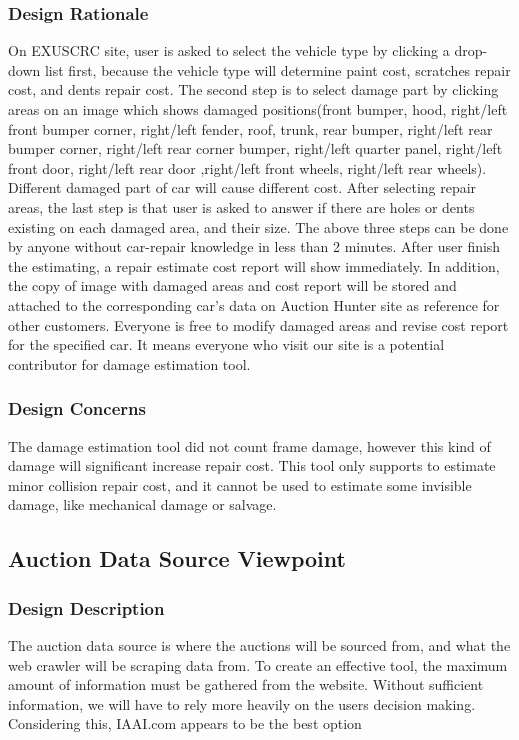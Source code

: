 \documentclass[onecolumn, draftclsnofoot, 10pt, compsoc]{IEEEtran}
\begin{document}
\subsubsection{Design Rationale}
On EXUSCRC site, user is asked to select the vehicle type by clicking a drop-down list first, because the vehicle type will determine paint cost, scratches repair cost, and dents repair cost. The second step is to select damage part by clicking areas on an image which shows damaged positions(front bumper, hood, right/left front bumper corner,  right/left fender, roof, trunk, rear bumper, right/left rear bumper corner, right/left rear corner bumper, right/left quarter panel, right/left front door, right/left rear door ,right/left front wheels, right/left rear wheels). Different damaged part of car will cause different cost. After selecting repair areas, the last step is that user is asked to answer if there are holes or dents existing on each damaged area, and their size. The above three steps can be done by anyone without car-repair knowledge in less than 2 minutes. After user finish the estimating, a repair estimate cost report will show immediately. In addition, the copy of image with damaged areas and cost report will be stored and attached to the corresponding car's data on Auction Hunter site as reference for other customers. Everyone is free to modify damaged areas and revise cost report for the specified car. It means everyone who visit our site is a potential contributor for damage estimation tool.     
\subsubsection{Design Concerns}
The damage estimation tool did not count frame damage, however this kind of damage will significant increase repair cost. This tool only supports to estimate minor collision repair cost, and it cannot be used to estimate some invisible damage, like mechanical damage or salvage.



\subsection{Auction Data Source Viewpoint}
\subsubsection{Design Description}
The auction data source is where the auctions will be sourced from, and what the web crawler will be scraping data from. To create an effective tool, the maximum amount of information must be gathered from the website. Without sufficient information, we will have to rely more heavily on the users decision making. Considering this, IAAI.com \cite{IAAI} appears to be the best option 
\end{document}
